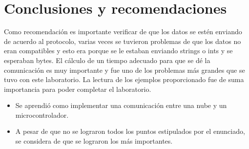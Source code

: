 \section{Conclusiones y recomendaciones}
Como recomendación es importante verificar de que los datos se estén enviando de acuerdo al protocolo, varias veces se tuvieron problemas de que los datos no eran compatibles y esto era porque se le estaban enviando strings o ints y se esperaban bytes. El cálculo de un tiempo adecuado para que se dé la comunicación es muy importante y fue uno de los problemas más grandes que se tuvo con este laboratorio. La lectura de los ejemplos proporcionado fue de suma importancia para poder completar el laboratorio.
\begin{itemize}
    \item Se aprendió como implementar una comunicación entre una nube y un microcontrolador.
    \item A pesar de que no se lograron todos los puntos estipulados por el enunciado, se considera de que se lograron los más importantes. 
\end{itemize}